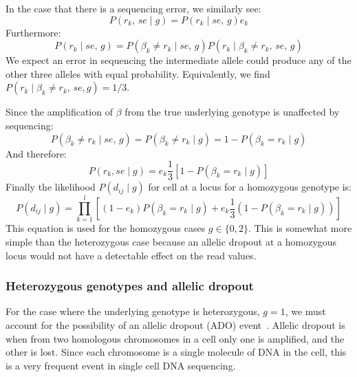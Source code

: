 \documentclass[../../main.tex]{subfiles}
\begin{document}
In the case that there is a sequencing error, we similarly see:
\begin{equation*}
    P(r_k,\, se \mid g) = P(r_k\mid se,\, g)e_k
\end{equation*}
Furthermore:
\begin{equation*}
    P(r_k\mid se,\, g) = P(\beta_k\neq r_k \mid se,\,g) P(r_k\mid \beta_k\neq r_k,\,se,\,g)
\end{equation*}
We expect an error in sequencing the intermediate allele could produce any of the other three alleles with equal probability.
Equivalently, we find $P(r_k\mid \beta_k \neq r_k,\,se,g)=1/3$.

Since the amplification of $\beta$ from the true underlying genotype is unaffected by sequencing:
\begin{equation*}
    P(\beta_k\neq r_k \mid se,\,g)=P(\beta_k\neq r_k\mid g)=1-P(\beta_k=r_k\mid g)
\end{equation*}
And therefore:
\begin{equation*}
    P(r_k, se \mid g) = e_k \frac{1}{3}\left[1-P(\beta_k=r_k\mid g)\right]
\end{equation*}
Finally the likelihood $P(d_{ij}\mid g)$ for cell at a locus for a homozygous genotype is:
\begin{equation}
     P(d_{ij}\mid g) = \prod_{k=1}^l \left[ (1-e_k)P(\beta_k=r_k\mid g) + e_k \frac{1}{3} (1-P(\beta_k=r_k\mid g)) \right]
\end{equation}
This equation is used for the homozygous cases $g\in\{0,2\}$.
This is somewhat more simple than the heterozygous case because an allelic dropout at a homozygous locus would not have a detectable effect on the read values.

\subsubsection*{Heterozygous genotypes and allelic dropout}
For the case where the underlying genotype is heterozygous, $g=1$, we must account for the possibility of an allelic dropout (ADO) event~\cite{monovar,sciphi}.
Allelic dropout is when from two homologous chromosomes in a cell only one is amplified, and the other is lost.
Since each chromosome is a single molecule of DNA in the cell, this is a very frequent event in single cell DNA sequencing.
\end{document}

